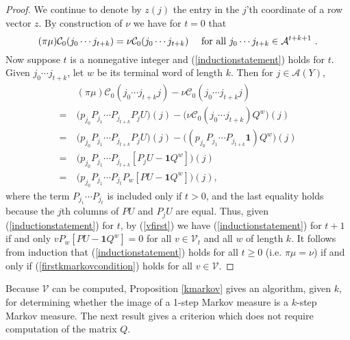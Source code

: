\documentclass{kepart2010}
\theoremstyle{plain}
\theoremstyle{definition}
\theoremstyle{remark}
\theoremstyle{definition}
\numberwithin{equation}{section}
\begin{document}
 \begin{proof}
 We continue to denote by
$z(j)$ the
entry in the $j$'th coordinate of a row
 vector
$z$. By  construction of $\nu$ we have for $t=0$ that \begin{equation}
\label{inductionstatement} (\pi \mu){{\mathcal C}}_0(j_0\cdots j_{t+k}) = \nu
{{\mathcal C}}_0(j_0\cdots j_{t+k})\  \quad \textnormal{for all }j_0\cdots
j_{t+k}\in \mathcal A^{t+k+1} \ . \end{equation} Now suppose $t$ is a
nonnegative integer and (\ref{inductionstatement}) holds for $t$.
Given
 $j_0\cdots j_{t+k}$, let $w$ be its terminal word of
length $k$. Then for  $j\in \mathcal A(Y)$,
\begin{align*}
&(\pi \mu){{\mathcal C}}_0(j_0\cdots
j_{t+k}j) -
\nu {{\mathcal C}}_0(j_0\cdots
j_{t+k}j)
\\
 = \
&\Big( p_{j_0}P_{j_1}\cdots P_{j_{t+k}}P_jU\Big)(j) -
\Big(\nu \mathcal C_0(j_0\cdots j_{t+k})Q^{w}\Big)(j) \\
=\ &\Big( p_{j_0}P_{j_1}\cdots P_{j_{t+k}}P_jU\Big)(j) -
\Big( (p_{j_0}P_{j_1}\cdots
P_{j_{t+k}}\mathbf 1)Q^{w}\Big) (j) \\
=\ &\Big( p_{j_0}P_{j_1}\cdots P_{j_{t+k}}
[P_jU -\mathbf 1 Q^{w}]\Big)(j)  \\
=\ &\Big( p_{j_0}P_{j_1}\cdots P_{j_{t}}P_w [PU -\mathbf 1
Q^{w}]\Big)(j) ,
\end{align*}
where  the term $P_{j_1}\cdots P_{j_{t}}$ is included only if $t>0$,
and the last equality holds because
the $j$th columns of $PU$ and $P_jU$ are equal.
Thus, given (\ref{inductionstatement}) for $t$,
by (\ref{vfirst}) we
have (\ref{inductionstatement}) for $t+1$ if and only
$vP_w[PU -\mathbf 1 Q^{w}]=0$ for all $v\in \mathcal V_{t}$
and all $w$ of length $k$.
It follows from induction that (\ref{inductionstatement})
holds for all $t\geq 0$ (i.e. $\pi \mu = \nu$) if and only
if
(\ref{firstkmarkovcondition}) holds for all $v\in \mathcal V$.
\end{proof}

Because $\mathcal V$ can be computed,  Proposition
\ref{kmarkov} gives an algorithm, given $k$,  for determining whether
the image of a 1-step Markov measure is a $k$-step Markov measure.
The next result gives a criterion which does not require computation
of the matrix $Q$.
\end{document}
